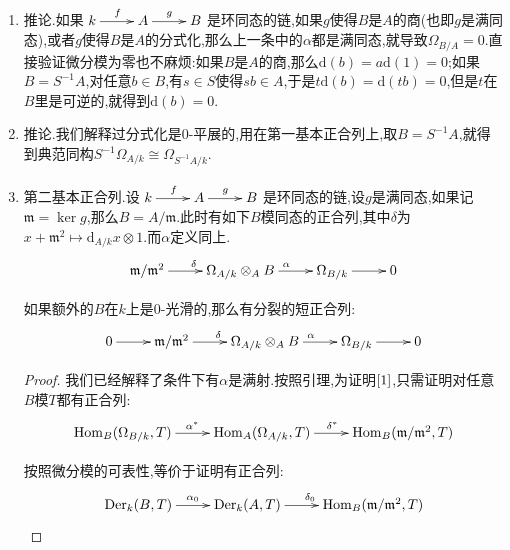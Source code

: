 \begin{enumerate}
\begin{proof}
		这证明了定理的前半段.下面设$B$在$A$上0-光滑,我们要证明的是$\alpha_0$是满射.任取$D\in\mathrm{Der}_k(A,T)$,取$\varphi:A\to B\star T$是$a\mapsto(g(a),Da)$,我们有如下实线的交换图表,于是按照0-光滑条件,就存在提升$h:B\to B\star T$使得图表交换.
		$$\xymatrix{B\ar[rr]^{1_B}\ar@{-->}[drr]^h&&B\\A\ar[u]^g\ar[rr]_{\varphi}&&B\star T\ar[u]}$$
		
		可记$h(b)=(b,D'b)$,那么从$h(b_1b_2)=h(b_1)h(b_2)$得到$D'$是$B\to T$的导数.并且有$D=D'\circ g$.这得到$\alpha_0$是满射.最后我们证明了$\mathrm{Hom}$函子保这个短正合列,所以这个短正合列是分裂的.
	\end{proof}
	\item 推论.如果$\xymatrix{k\ar[r]^f&A\ar[r]^g&B}$是环同态的链,如果$g$使得$B$是$A$的商(也即$g$是满同态),或者$g$使得$B$是$A$的分式化,那么上一条中的$\alpha$都是满同态,就导致$\Omega_{B/A}=0$.直接验证微分模为零也不麻烦:如果$B$是$A$的商,那么$\mathrm{d}(b)=a\mathrm{d}(1)=0$;如果$B=S^{-1}A$,对任意$b\in B$,有$s\in S$使得$sb\in A$,于是$t\mathrm{d}(b)=\mathrm{d}(tb)=0$,但是$t$在$B$里是可逆的,就得到$\mathrm{d}(b)=0$.
	\item 推论.我们解释过分式化是0-平展的,用在第一基本正合列上,取$B=S^{-1}A$,就得到典范同构$S^{-1}\Omega_{A/k}\cong\Omega_{S^{-1}A/k}$.
	\item 第二基本正合列.设$\xymatrix{k\ar[r]^f&A\ar[r]^g&B}$是环同态的链,设$g$是满同态,如果记$\mathfrak{m}=\ker g$,那么$B=A/\mathfrak{m}$.此时有如下$B$模同态的正合列,其中$\delta$为$x+\mathfrak{m}^2\mapsto\mathrm{d}_{A/k}x\otimes1$.而$\alpha$定义同上.
	\begin{equation}\label{1}
		\xymatrix{\mathfrak{m}/\mathfrak{m}^2\ar[r]^{\delta}&\Omega_{A/k}\otimes_AB\ar[r]^{\alpha}&\Omega_{B/k}\ar[r]&0}
	\end{equation}
	
	如果额外的$B$在$k$上是0-光滑的,那么有分裂的短正合列:
	\begin{equation}\label{2}
		\xymatrix{0\ar[r]&\mathfrak{m}/\mathfrak{m}^2\ar[r]^{\delta}&\Omega_{A/k}\otimes_AB\ar[r]^{\alpha}&\Omega_{B/k}\ar[r]&0}
	\end{equation}
	\begin{proof}
		
		我们已经解释了条件下有$\alpha$是满射.按照引理,为证明$\ref{1}$,只需证明对任意$B$模$T$都有正合列:
		$$\xymatrix{\mathrm{Hom}_B(\Omega_{B/k},T)\ar[r]^{\alpha^*}&\mathrm{Hom}_A(\Omega_{A/k},T)\ar[r]^{\delta^*}&\mathrm{Hom}_B(\mathfrak{m}/\mathfrak{m}^2,T)}$$
		
		按照微分模的可表性,等价于证明有正合列:
		$$\xymatrix{\mathrm{Der}_k(B,T)\ar[r]^{\alpha_0}&\mathrm{Der}_k(A,T)\ar[r]^{\delta_0}&\mathrm{Hom}_B(\mathfrak{m}/\mathfrak{m}^2,T)}$$
		

\end{proof}
\end{enumerate}
